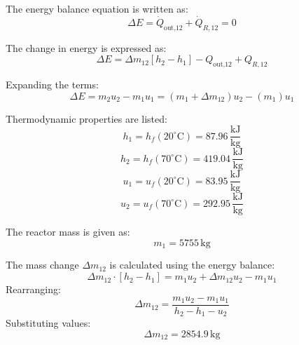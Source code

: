 The energy balance equation is written as:  
\[
\Delta E = \dot{Q}_{\text{out,12}} + \dot{Q}_{R,12} = 0
\]  

The change in energy is expressed as:  
\[
\Delta E = \Delta m_{12} \left[ h_2 - h_1 \right] - Q_{\text{out,12}} + Q_{R,12}
\]  

Expanding the terms:  
\[
\Delta E = m_2 u_2 - m_1 u_1 = (m_1 + \Delta m_{12}) u_2 - (m_1) u_1
\]  

Thermodynamic properties are listed:  
\[
h_1 = h_f(20^\circ\text{C}) = 87.96 \, \frac{\text{kJ}}{\text{kg}}
\]  
\[
h_2 = h_f(70^\circ\text{C}) = 419.04 \, \frac{\text{kJ}}{\text{kg}}
\]  
\[
u_1 = u_f(20^\circ\text{C}) = 83.95 \, \frac{\text{kJ}}{\text{kg}}
\]  
\[
u_2 = u_f(70^\circ\text{C}) = 292.95 \, \frac{\text{kJ}}{\text{kg}}
\]  

The reactor mass is given as:  
\[
m_1 = 5755 \, \text{kg}
\]  

The mass change \( \Delta m_{12} \) is calculated using the energy balance:  
\[
\Delta m_{12} \cdot \left[ h_2 - h_1 \right] = m_1 u_2 + \Delta m_{12} u_2 - m_1 u_1
\]  
Rearranging:  
\[
\Delta m_{12} = \frac{m_1 u_2 - m_1 u_1}{h_2 - h_1 - u_2}
\]  
Substituting values:  
\[
\Delta m_{12} = 2854.9 \, \text{kg}
\]